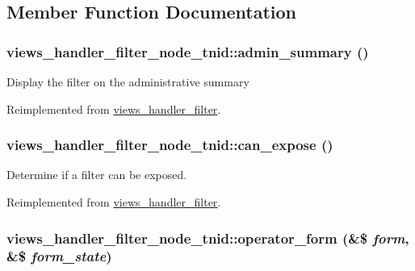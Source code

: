 \subsection{Member Function Documentation}
\hypertarget{classviews__handler__filter__node__tnid_037932cf19297e4b8544c24747509823}{
\subsubsection[{admin\_\-summary}]{\setlength{\rightskip}{0pt plus 5cm}views\_\-handler\_\-filter\_\-node\_\-tnid::admin\_\-summary ()}}
\label{classviews__handler__filter__node__tnid_037932cf19297e4b8544c24747509823}


Display the filter on the administrative summary 

Reimplemented from \hyperlink{classviews__handler__filter_655263cd0b73188eec064b9a9743fe4c}{views\_\-handler\_\-filter}.\hypertarget{classviews__handler__filter__node__tnid_9e6111d77af1aefee0b78d7b3b2c25cc}{
\subsubsection[{can\_\-expose}]{\setlength{\rightskip}{0pt plus 5cm}views\_\-handler\_\-filter\_\-node\_\-tnid::can\_\-expose ()}}
\label{classviews__handler__filter__node__tnid_9e6111d77af1aefee0b78d7b3b2c25cc}


Determine if a filter can be exposed. 

Reimplemented from \hyperlink{classviews__handler__filter_f0e5810a2a2f194cd6af0fca9c858756}{views\_\-handler\_\-filter}.\hypertarget{classviews__handler__filter__node__tnid_92d26c1ecccc0a2985d4195a46c7e87b}{
\subsubsection[{operator\_\-form}]{\setlength{\rightskip}{0pt plus 5cm}views\_\-handler\_\-filter\_\-node\_\-tnid::operator\_\-form (\&\$ {\em form}, \/  \&\$ {\em form\_\-state})}}
\label{classviews__handler__filter__node__tnid_92d26c1ecccc0a2985d4195a46c7e87b}


